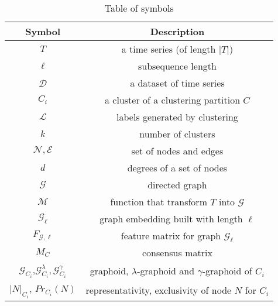 \begin{table}[tb]
\centering
\begin{tabular}{c|c}
\hline
{\bf Symbol} & {\bf Description} \\
\hline
$T$									& a time series (of length $|T|$) \\
$\ell$ 								& subsequence length\\
$\mathcal{D}$ 						& a dataset of time series\\
$C_i$							    & a cluster of a clustering partition $C$\\
$\mathcal{L}$						& labels generated by clustering\\
$k$							        & number of clusters\\
$\mathcal{N},\mathcal{E}$			& set of nodes and edges\\
$d$			& degrees of a set of nodes\\
$\mathcal{G}$			            & directed graph\\
$\mathcal{M}$ 						& function that transform $T$ into $\mathcal{G}$ \\
$\mathcal{G}_{\ell}$ 				& graph embedding built with length $\ell$ \\
$F_{\mathcal{G},\ell}$ 						& feature matrix for graph $\mathcal{G}_\ell$ \\
$M_C$ 								& consensus matrix \\
$\mathcal{G}_{C_i}$,$\mathcal{G}^{\lambda}_{C_i},\mathcal{G}^{\gamma}_{C_i}$ 		& graphoid, $\lambda$-graphoid and $\gamma$-graphoid of $C_i$ \\
$|N|_{C_i}$, $Pr_{C_i}(N)$						& representativity, exclusivity of node $N$ for $C_i$\\
\hline
\end{tabular}
\caption{Table of symbols}
\label{SymbolTable}
\end{table}